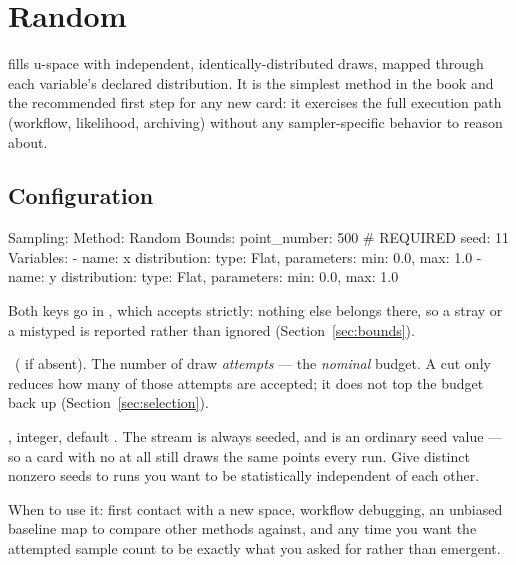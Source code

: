 \chapter{Random}
\label{ch:random}

  fills
u-space with independent, identically-distributed draws, mapped through each variable's
declared distribution. It is the simplest method in the book and the recommended first
step for any new card: it exercises the full execution path (workflow, likelihood,
archiving) without any sampler-specific behavior to reason about.

\section{Configuration}
\label{sec:random-config}

\begin{yamlwin}
Sampling:
  Method: Random
  Bounds:
    point_number: 500          # REQUIRED
    seed: 11
  Variables:
    - name: x
      distribution: {type: Flat, parameters: {min: 0.0, max: 1.0}}
    - name: y
      distribution: {type: Flat, parameters: {min: 0.0, max: 1.0}}
\end{yamlwin}

Both keys go in , which  accepts strictly: nothing else
belongs there, so a stray  or a mistyped  is reported
rather than ignored (Section~\ref{sec:bounds}).

\begin{keylist}
  \item[Bounds.point\_number] \req\ ( if absent). The number of draw
        \emph{attempts} --- the \emph{nominal} budget. A  cut only
        reduces how many of those attempts are accepted; it does not top the budget
        back up (Section~\ref{sec:selection}).
  \item[Bounds.seed] \opt, integer, default . The stream is always seeded, and
         is an ordinary seed value --- so a card with no  at all
        still draws the same points every run. Give distinct nonzero seeds to runs you
        want to be statistically independent of each other.
\end{keylist}

When to use it: first contact with a new space, workflow debugging, an unbiased
baseline map to compare other methods against, and any time you want the attempted
sample count to be exactly what you asked for rather than emergent.

